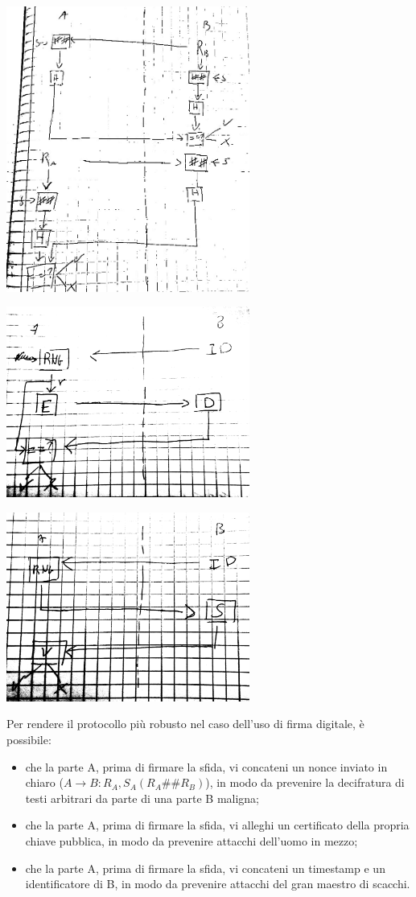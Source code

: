 \documentclass[answers, a4paper, 11pt]{exam}
\begin{document}
\begin{questions}
\begin{parts}
\begin{solution}
\includegraphics[width=0.6\textwidth]{crhashmut}

\includegraphics[width=0.6\textwidth]{crciph}

\includegraphics[width=0.6\textwidth]{crsign}

Per rendere il protocollo più robusto nel caso dell'uso di firma digitale, è possibile:
\begin{itemize}
\item che la parte A, prima di firmare la sfida, vi concateni un nonce inviato in chiaro ($A \rightarrow B: R_A, S_A (R_A \#\# R_B)$), in modo da prevenire la decifratura di testi arbitrari da parte di una parte B maligna;
\item che la parte A, prima di firmare la sfida, vi alleghi un certificato della propria chiave pubblica, in modo da prevenire attacchi dell'uomo in mezzo;
\item che la parte A, prima di firmare la sfida, vi concateni un timestamp e un identificatore di B, in modo da prevenire attacchi del gran maestro di scacchi.
\end{itemize}


\end{solution}
\end{parts}
\end{questions}
\end{document}
